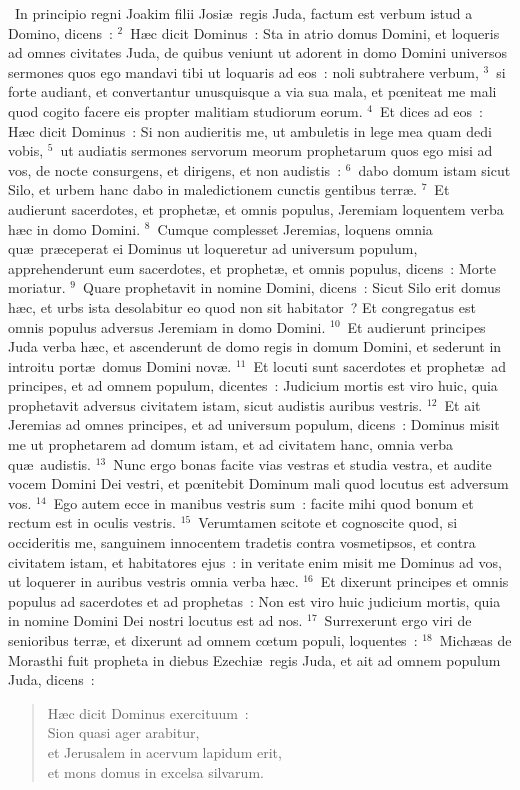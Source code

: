 ~In principio regni Joakim filii Josi\ae\ regis Juda, factum est verbum istud a Domino, dicens~:
${}^{2}$~H\ae c dicit Dominus~: Sta in atrio domus Domini, et loqueris ad omnes civitates Juda, de quibus veniunt ut adorent in domo Domini universos sermones quos ego mandavi tibi ut loquaris ad eos~: noli subtrahere verbum,
${}^{3}$~si forte audiant, et convertantur unusquisque a via sua mala, et pœniteat me mali quod cogito facere eis propter malitiam studiorum eorum.
${}^{4}$~Et dices ad eos~: H\ae c dicit Dominus~: Si non audieritis me, ut ambuletis in lege mea quam dedi vobis,
${}^{5}$~ut audiatis sermones servorum meorum prophetarum quos ego misi ad vos, de nocte consurgens, et dirigens, et non audistis~:
${}^{6}$~dabo domum istam sicut Silo, et urbem hanc dabo in maledictionem cunctis gentibus terr\ae .
${}^{7}$~Et audierunt sacerdotes, et prophet\ae , et omnis populus, Jeremiam loquentem verba h\ae c in domo Domini.
${}^{8}$~Cumque complesset Jeremias, loquens omnia qu\ae\ pr\ae ceperat ei Dominus ut loqueretur ad universum populum, apprehenderunt eum sacerdotes, et prophet\ae , et omnis populus, dicens~: Morte moriatur.
${}^{9}$~Quare prophetavit in nomine Domini, dicens~: Sicut Silo erit domus h\ae c, et urbs ista desolabitur eo quod non sit habitator~? Et congregatus est omnis populus adversus Jeremiam in domo Domini.
${}^{10}$~Et audierunt principes Juda verba h\ae c, et ascenderunt de domo regis in domum Domini, et sederunt in introitu port\ae\ domus Domini nov\ae .
${}^{11}$~Et locuti sunt sacerdotes et prophet\ae\ ad principes, et ad omnem populum, dicentes~: Judicium mortis est viro huic, quia prophetavit adversus civitatem istam, sicut audistis auribus vestris.
${}^{12}$~Et ait Jeremias ad omnes principes, et ad universum populum, dicens~: Dominus misit me ut prophetarem ad domum istam, et ad civitatem hanc, omnia verba qu\ae\ audistis.
${}^{13}$~Nunc ergo bonas facite vias vestras et studia vestra, et audite vocem Domini Dei vestri, et pœnitebit Dominum mali quod locutus est adversum vos.
${}^{14}$~Ego autem ecce in manibus vestris sum~: facite mihi quod bonum et rectum est in oculis vestris.
${}^{15}$~Verumtamen scitote et cognoscite quod, si occideritis me, sanguinem innocentem tradetis contra vosmetipsos, et contra civitatem istam, et habitatores ejus~: in veritate enim misit me Dominus ad vos, ut loquerer in auribus vestris omnia verba h\ae c.
${}^{16}$~Et dixerunt principes et omnis populus ad sacerdotes et ad prophetas~: Non est viro huic judicium mortis, quia in nomine Domini Dei nostri locutus est ad nos.
${}^{17}$~Surrexerunt ergo viri de senioribus terr\ae , et dixerunt ad omnem cœtum populi, loquentes~:
${}^{18}$~Mich\ae as de Morasthi fuit propheta in diebus Ezechi\ae\ regis Juda, et ait ad omnem populum Juda, dicens~: \begin{flushleft}\begin{verse}H\ae c dicit Dominus exercituum~:\\ Sion quasi ager arabitur,\\ et Jerusalem in acervum lapidum erit,\\ et mons domus in excelsa silvarum.\end{verse}\end{flushleft}


